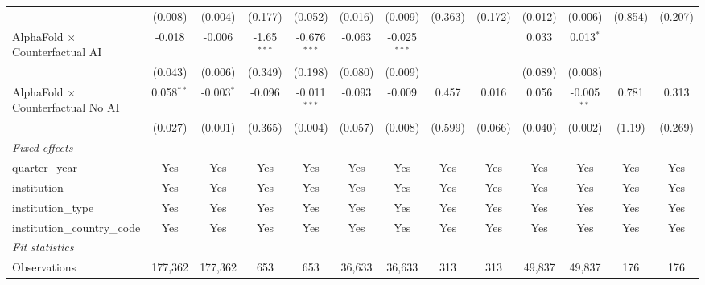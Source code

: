 \begin{tabular}{lcccccccccccc}
                                            & (0.008)       & (0.004)       & (0.177)       & (0.052)        & (0.016)       & (0.009)        & (0.363) & (0.172) & (0.012)       & (0.006)       & (0.854) & (0.207)\\   
   AlphaFold $\times$ Counterfactual AI     & -0.018        & -0.006        & -1.65$^{***}$ & -0.676$^{***}$ & -0.063        & -0.025$^{***}$ &         &         & 0.033         & 0.013$^{*}$   &         &   \\   
                                            & (0.043)       & (0.006)       & (0.349)       & (0.198)        & (0.080)       & (0.009)        &         &         & (0.089)       & (0.008)       &         &   \\   
   AlphaFold $\times$ Counterfactual No AI  & 0.058$^{**}$  & -0.003$^{*}$  & -0.096        & -0.011$^{***}$ & -0.093        & -0.009         & 0.457   & 0.016   & 0.056         & -0.005$^{**}$ & 0.781   & 0.313\\   
                                            & (0.027)       & (0.001)       & (0.365)       & (0.004)        & (0.057)       & (0.008)        & (0.599) & (0.066) & (0.040)       & (0.002)       & (1.19)  & (0.269)\\   
   \midrule
   \emph{Fixed-effects}\\
   quarter\_year                            & Yes           & Yes           & Yes           & Yes            & Yes           & Yes            & Yes     & Yes     & Yes           & Yes           & Yes     & Yes\\  
   institution                              & Yes           & Yes           & Yes           & Yes            & Yes           & Yes            & Yes     & Yes     & Yes           & Yes           & Yes     & Yes\\  
   institution\_type                        & Yes           & Yes           & Yes           & Yes            & Yes           & Yes            & Yes     & Yes     & Yes           & Yes           & Yes     & Yes\\  
   institution\_country\_code               & Yes           & Yes           & Yes           & Yes            & Yes           & Yes            & Yes     & Yes     & Yes           & Yes           & Yes     & Yes\\  
   \midrule
   \emph{Fit statistics}\\
   Observations                             & 177,362       & 177,362       & 653           & 653            & 36,633        & 36,633         & 313     & 313     & 49,837        & 49,837        & 176     & 176\\  

\end{tabular}
